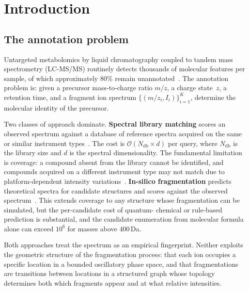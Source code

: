\documentclass[twocolumn,10pt,a4paper]{article}
\theoremstyle{thmstyle}
\theoremstyle{definition}
\theoremstyle{remark}
\begin{document}
\tableofcontents

\section{Introduction}
\label{sec:intro}

\subsection{The annotation problem}

Untargeted metabolomics by liquid chromatography coupled to tandem mass
spectrometry (LC-MS/MS) routinely detects thousands of molecular features
per sample, of which approximately 80\% remain
unannotated~\citep{fiehn2002metabolomics,kind2018identification}. The
annotation problem is: given a precursor mass-to-charge ratio $m/z$, a
charge state~$z$, a retention time, and a fragment ion spectrum
$\{(m/z_i, I_i)\}_{i=1}^{K}$, determine the molecular identity of the
precursor.

Two classes of approach dominate. \textbf{Spectral library matching}
scores an observed spectrum against a database of reference spectra
acquired on the same or similar instrument
types~\citep{stein2012mass,horai2010massbank}. The cost is
$\mathcal{O}(N_{\mathrm{db}} \times d)$ per query, where
$N_{\mathrm{db}}$ is the library size and $d$ is the spectral
dimensionality. The fundamental limitation is coverage: a compound
absent from the library cannot be identified, and compounds acquired on
a different instrument type may not match due to platform-dependent
intensity variations~\citep{kind2007fiehnlib}. \textbf{In-silico
fragmentation} predicts theoretical spectra for candidate structures
and scores against the observed spectrum~\citep{duhrkop2019sirius,
wei2019rapid}. This extends coverage to any structure whose
fragmentation can be simulated, but the per-candidate cost of quantum-
chemical or rule-based prediction is substantial, and the candidate
enumeration from molecular formula alone can exceed $10^6$ for masses
above 400\,Da.

Both approaches treat the spectrum as an empirical fingerprint. Neither
exploits the geometric structure of the fragmentation process: that
each ion occupies a specific location in a bounded oscillatory phase
space, and that fragmentations are transitions between locations in a
structured graph whose topology determines both which fragments appear
and at what relative intensities.
\end{document}
